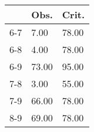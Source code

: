 \begin{table}[ht]
\centering
\begin{tabular}{rll}
  \hline
 & Obs. & Crit. \\ 
  \hline
6-7 & 7.00 & 78.00 \\ 
  6-8 & 4.00 & 78.00 \\ 
  6-9 & 73.00 & 95.00 \\ 
  7-8 & 3.00 & 55.00 \\ 
  7-9 & 66.00 & 78.00 \\ 
  8-9 & 69.00 & 78.00 \\ 
   \hline
\end{tabular}
\end{table}
